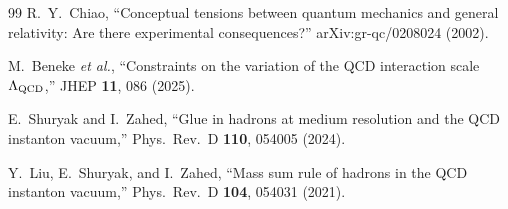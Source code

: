 \documentclass[aps,prd,twocolumn,superscriptaddress,floatfix,nofootinbib]{revtex4-2}
\begin{document}
\begin{thebibliography}{99}
R.~Y.~Chiao,
``Conceptual tensions between quantum mechanics and general relativity:
Are there experimental consequences?''
arXiv:gr-qc/0208024 (2002).

M.~Beneke \emph{et al.},
``Constraints on the variation of the QCD interaction scale $\Lambda_{\rm QCD}$,''
JHEP \textbf{11}, 086 (2025).

E.~Shuryak and I.~Zahed,
``Glue in hadrons at medium resolution and the QCD instanton vacuum,''
Phys.\ Rev.\ D \textbf{110}, 054005 (2024).

Y.~Liu, E.~Shuryak, and I.~Zahed,
``Mass sum rule of hadrons in the QCD instanton vacuum,''
Phys.\ Rev.\ D \textbf{104}, 054031 (2021).

\end{thebibliography}
\end{document}
